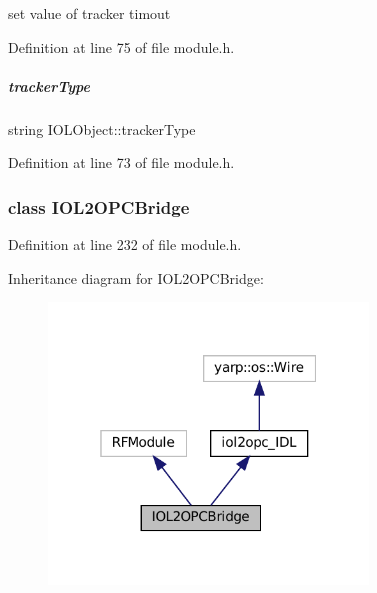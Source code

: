 set value of tracker timout 



Definition at line 75 of file module.\+h.

\mbox{\label{group__iol2opc_a08dfc6b6b77b90ae16bd275b1f0ebd7b}} 
\subparagraph{\texorpdfstring{tracker\+Type}{trackerType}}
{\footnotesize\ttfamily string I\+O\+L\+Object\+::tracker\+Type\hspace{0.3cm}{\ttfamily [protected]}}



Definition at line 73 of file module.\+h.

\label{classIOL2OPCBridge}
\subsubsection{class I\+O\+L2\+O\+P\+C\+Bridge}


Definition at line 232 of file module.\+h.



Inheritance diagram for I\+O\+L2\+O\+P\+C\+Bridge\+:
\nopagebreak
\begin{figure}[H]
\begin{center}
\leavevmode
\includegraphics[width=241pt]{classIOL2OPCBridge__inherit__graph}
\end{center}
\end{figure}
